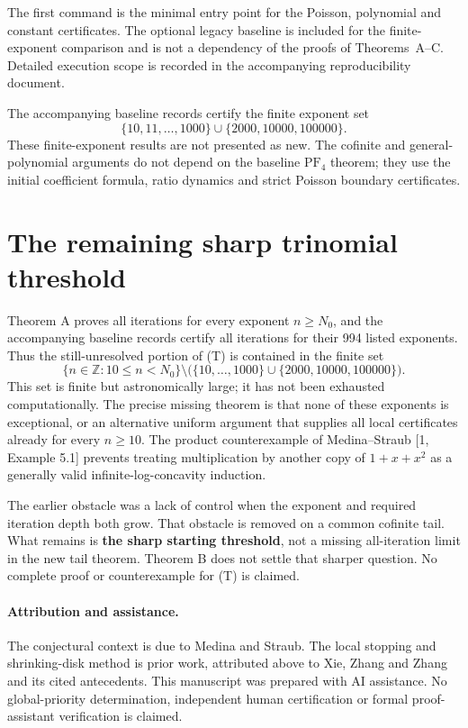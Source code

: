 \documentclass[11pt,a4paper]{article}
\begin{document}
The first command is the minimal entry point for the Poisson, polynomial and constant certificates. The optional legacy baseline is included for the finite-exponent comparison and is not a dependency of the proofs of Theorems~A--C. Detailed execution scope is recorded in the accompanying reproducibility document.

The accompanying baseline records \cite{Data} certify the finite exponent set
\[
 \{10,11,\ldots,1000\}\cup\{2000,10000,100000\}.
\]
These finite-exponent results are not presented as new. The cofinite and general-polynomial arguments do not depend on the baseline \(\mathrm{PF}_4\) theorem; they use the initial coefficient formula, ratio dynamics and strict Poisson boundary certificates.

\section{The remaining sharp trinomial threshold}\label{precise-remaining-gap-for-the-requested-target}


Theorem A proves all iterations for every exponent \(n\geq N_0\), and
the accompanying baseline records certify all iterations for their 994 listed
exponents. Thus the still-unresolved portion of (T) is contained in the
finite set \[
 \{n\in\mathbb Z:10\leq n<N_0\}
 \setminus\bigl(\{10,\ldots,1000\}\cup\{2000,10000,100000\}\bigr). \tag{40}
\] This set is finite but astronomically large; it has not been
exhausted computationally. The precise missing theorem is that none of
these exponents is exceptional, or an alternative uniform argument that
supplies all local certificates already for every \(n\geq10\). The
product counterexample of Medina--Straub [1, Example 5.1] prevents treating multiplication by
another copy of \(1+x+x^2\) as a generally valid infinite-log-concavity
induction.

The earlier obstacle was a lack of control when the exponent and
required iteration depth both grow. That obstacle is removed on a common
cofinite tail. What remains is \textbf{the sharp starting threshold},
not a missing all-iteration limit in the new tail theorem. Theorem B
does not settle that sharper question. No complete proof or
counterexample for (T) is claimed.


\paragraph{Attribution and assistance.}
The conjectural context is due to Medina and Straub. The local stopping and shrinking-disk method is prior work, attributed above to Xie, Zhang and Zhang and its cited antecedents. This manuscript was prepared with AI assistance. No global-priority determination, independent human certification or formal proof-assistant verification is claimed.
\end{document}
